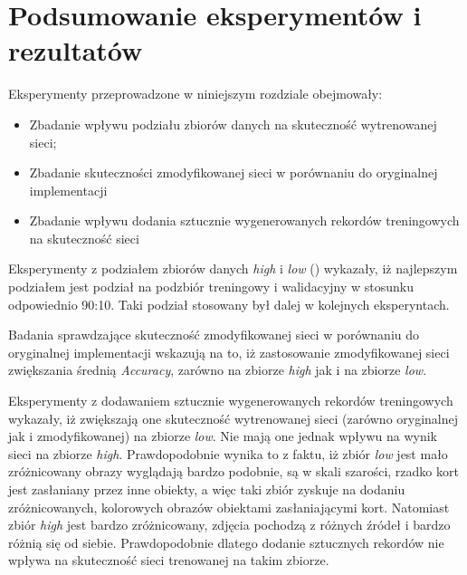 \section{Podsumowanie eksperymentów i rezultatów}
Eksperymenty przeprowadzone w niniejszym rozdziale obejmowały:
\begin{itemize}
 \item Zbadanie wpływu podziału zbiorów danych na skuteczność wytrenowanej sieci;
 \item Zbadanie skuteczności zmodyfikowanej sieci w porównaniu do oryginalnej implementacji
 \item Zbadanie wpływu dodania sztucznie wygenerowanych rekordów treningowych na skuteczność sieci
\end{itemize}

Eksperymenty z podziałem zbiorów danych \textit{high} i \textit{low} () wykazały, iż najlepszym podziałem jest podział na podzbiór treningowy i walidacyjny w stosunku odpowiednio 90:10. Taki podział stosowany był dalej w kolejnych eksperyntach.


Badania sprawdzające skuteczność zmodyfikowanej sieci w porównaniu do oryginalnej implementacji wskazują na to, iż zastosowanie zmodyfikowanej sieci zwiększania średnią \textit{Accuracy}, zarówno na zbiorze \textit{high} jak i na zbiorze \textit{low}.


Eksperymenty z dodawaniem sztucznie wygenerowanych rekordów treningowych wykazały, iż zwiększają one skuteczność wytrenowanej sieci (zarówno oryginalnej jak i zmodyfikowanej) na zbiorze \textit{low}. Nie mają one jednak wpływu na wynik sieci na zbiorze \textit{high}. Prawdopodobnie wynika to z faktu, iż zbiór \textit{low} jest mało zróżnicowany obrazy wyglądają bardzo podobnie, są w skali szarości, rzadko kort jest zasłaniany przez inne obiekty, a więc taki zbiór zyskuje na dodaniu zróżnicowanych, kolorowych obrazów obiektami zasłaniającymi kort. Natomiast zbiór \textit{high} jest bardzo zróżnicowany, zdjęcia pochodzą z różnych źródeł i bardzo różnią się od siebie. Prawdopodobnie dlatego dodanie sztucznych rekordów nie wpływa na skuteczność sieci trenowanej na takim zbiorze.
